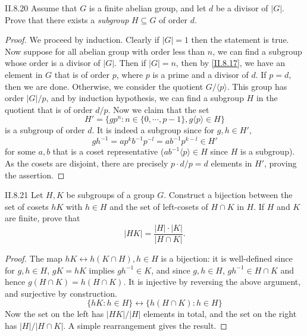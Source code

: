 \begin{problem}{II.8.20}
Assume that $G$ is a finite abelian group, and let $d$ be a divisor of $|G|$. Prove that there exists a \textit{subgroup} $H \subseteq G$ of order $d$.
\end{problem}
\begin{proof}
We proceed by induction. Clearly if $|G| = 1$ then the statement is true. Now suppose for all abelian group with order less than $n$, we can find a subgroup whose order is a divisor of $|G|$. Then if $|G| = n$, then by \ref{II.8.17}, we have an element in $G$ that is of order $p$, where $p$ is a prime and a divisor of $d$. If $p = d$, then we are done. Otherwise, we consider the quotient $G/\langle p \rangle$. This group has order $|G|/p$, and by induction hypothesis, we can find a subgroup $H$ in the quotient that is of order $d/p$. Now we claim that the set
\[
H' = \{ gp^n : n \in \{0, \cdots, p-1\}, g\langle p \rangle \in H \}
\]
is a subgroup of order $d$. It is indeed a subgroup since for $g, h \in H'$,
\[
gh^{-1} = ap^kb^{-1}p^{-l} = ab^{-1}p^{k-l} \in H'
\]
for some $a, b$ that is a coset representative ($ab^{-1}\langle p \rangle \in H$ since $H$ is a subgroup). As the cosets are disjoint, there are precisely $p \cdot d/p = d$ elements in $H'$, proving the assertion.
\end{proof}

\begin{problem}{II.8.21}
Let $H,K$ be subgroups of a group $G$. Construct a bijection between the set of cosets $hK$ with $h \in H$ and the set of left-cosets of $H \cap K$ in $H$. If $H$ and $K$ are finite, prove that 
\[
|HK| = \frac{|H| \cdot |K|}{|H \cap K|}.	
\]
\end{problem}
\begin{proof}
The map $hK \leftrightarrow h(K \cap H), h \in H$ is a bijection: it is well-defined since for $g, h \in H$, $gK = hK$ implies $gh^{-1} \in K$, and since $g,h \in H$, $gh^{-1} \in H \cap K$ and hence $g(H \cap K) = h(H \cap K).$ It is injective by reversing the above argument, and surjective by construction.
\[
\{hK:h \in H\} \longleftrightarrow \{h(H \cap K): h \in H\}	
\]
Now the set on the left has $|HK|/|H|$ elements in total, and the set on the right has $|H|/|H\cap K|$. A simple rearrangement gives the result.
\end{proof}

